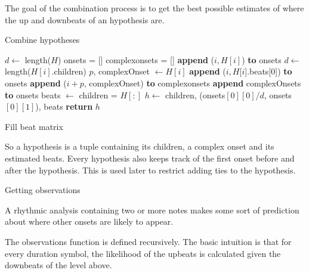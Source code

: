 The goal of the combination process is to get the best possible estimates of where the up and downbeats of an hypothesis are. 
\begin{algorithm}
\caption{Combine hypotheses}
\label{alg:hypotheses}
\begin{algorithmic}
	\State $d \leftarrow$ length($H$)
	\State onsets = []
	\State complexonsets = []
			\State \textbf{append} ($i, H[i]$) \textbf{to} onsets
		\EndIf
			\State $d \leftarrow$ length($H[i]$.children)
			\State $p$, complexOnset $\leftarrow H[i]$
				\State \textbf{append} ($i, H[i$].beats[0]) \textbf{to} onsets
			\Else
				\State \textbf{append} ($i + p$, complexOnset) \textbf{to} complexonsets
			\EndIf
		\EndIf
	\EndFor
		\State \textbf{append} complexOnsets \textbf{to} onsets
	\EndIf
	\State beats $\leftarrow$ 
	\State children = $H[:]$
	\State $h \leftarrow$ children, (onsets$[0][0]/d$, onsets$[0][1]$), beats
	\State \textbf{return} $h$
\EndFunction
\end{algorithmic}
\end{algorithm}

\begin{algorithm}
\caption{Fill beat matrix}
\label{alg:hypotheses}
\begin{algorithmic}
\EndFunction
\end{algorithmic}
\end{algorithm}

So a hypothesis is a tuple containing its children, a complex onset and its estimated beats.
Every hypothesis also keeps track of the first onset before and after the hypothesis. This is used later to restrict adding ties to the hypothesis.

Getting observations


A rhythmic analysis containing two or more notes makes some sort of prediction about where other onsets are likely to appear. 

The observations function is defined recursively. The basic intuition is that for every duration symbol, the likelihood of the upbeats is calculated given the downbeats of the level above. 

